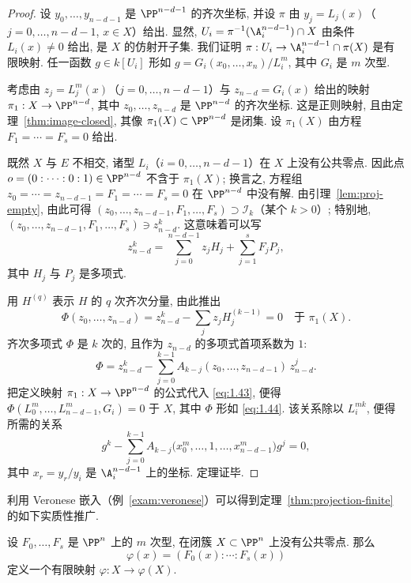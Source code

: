 \begin{proof}
	设 $y_0, \ldots, y_{n-d-1}$ 是 $\PP^{n-d-1}$ 的齐次坐标, 并设 $\pi$ 由 $y_j = L_j(x)$（$j = 0, \ldots, n-d-1$, $x \in X$）给出. 显然, $U_i = \pi^{-1}(\A^{n-d-1}_i) \cap X$ 由条件 $L_i(x) \ne 0$ 给出, 是 $X$ 的仿射开子集. 我们证明 $\pi: U_i \to \A^{n-d-1}_i \cap \pi(X)$ 是有限映射. 任一函数 $g \in k[U_i]$ 形如 $g = G_i(x_0, \ldots, x_n)/L_i^m$, 其中 $G_i$ 是 $m$ 次型.

	考虑由 $z_j = L_j^m(x)$（$j = 0, \ldots, n-d-1$）与 $z_{n-d} = G_i(x)$ 给出的映射 $\pi_1: X \to \PP^{n-d}$, 其中 $z_0, \ldots, z_{n-d}$ 是 $\PP^{n-d}$ 的齐次坐标. 这是正则映射, 且由定理~\ref{thm:image-closed}, 其像 $\pi_1(X) \subset \PP^{n-d}$ 是闭集. 设 $\pi_1(X)$ 由方程 $F_1 = \cdots = F_s = 0$ 给出.

	既然 $X$ 与 $E$ 不相交, 诸型 $L_i$（$i = 0, \ldots, n-d-1$）在 $X$ 上没有公共零点. 因此点 $o = (0 : \cdots : 0 : 1) \in \PP^{n-d}$ 不含于 $\pi_1(X)$; 换言之, 方程组 $z_0 = \cdots = z_{n-d-1} = F_1 = \cdots = F_s = 0$ 在 $\PP^{n-d}$ 中没有解. 由引理~\ref{lem:proj-empty}, 由此可得 $(z_0, \ldots, z_{n-d-1}, F_1, \ldots, F_s) \supset \mathcal I_k$（某个 $k > 0$）; 特别地, $(z_0, \ldots, z_{n-d-1}, F_1, \ldots, F_s) \ni z_{n-d}^k$. 这意味着可以写
	\[
		z_{n-d}^k = \sum_{j=0}^{n-d-1} z_j H_j + \sum_{j=1}^{s} F_j P_j,
	\]
	其中 $H_j$ 与 $P_j$ 是多项式.

	用 $H^{(q)}$ 表示 $H$ 的 $q$ 次齐次分量, 由此推出
	\begin{equation}
		\label{eq:1.43}
		\Phi(z_0, \ldots, z_{n-d}) = z_{n-d}^k - \sum_j z_j H_j^{(k-1)} = 0 \quad \text{于 } \pi_1(X).
	\end{equation}
	齐次多项式 $\Phi$ 是 $k$ 次的, 且作为 $z_{n-d}$ 的多项式首项系数为 $1$:
	\begin{equation}
		\label{eq:1.44}
		\Phi = z_{n-d}^k - \sum_{j=0}^{k-1} A_{k-j}(z_0, \ldots, z_{n-d-1})\, z_{n-d}^j.
	\end{equation}
	把定义映射 $\pi_1: X \to \PP^{n-d}$ 的公式代入 \eqref{eq:1.43}, 便得 $\Phi(L_0^m, \ldots, L_{n-d-1}^m, G_i) = 0$ 于 $X$, 其中 $\Phi$ 形如 \eqref{eq:1.44}. 该关系除以 $L_i^{mk}$, 便得所需的关系
	\[
		g^k - \sum_{j=0}^{k-1} A_{k-j}\bigl( x_0^m, \ldots, 1, \ldots, x_{n-d-1}^m \bigr) g^j = 0,
	\]
	其中 $x_r = y_r/y_i$ 是 $\A^{n-d-1}_i$ 上的坐标. 定理证毕.
\end{proof}

利用 Veronese 嵌入（例~\ref{exam:veronese}）可以得到定理~\ref{thm:projection-finite} 的如下实质性推广.

\begin{theorem}\label{thm:forms-finite}
	设 $F_0, \ldots, F_s$ 是 $\PP^n$ 上的 $m$ 次型, 在闭簇 $X \subset \PP^n$ 上没有公共零点. 那么
	\[
		\varphi(x) = (F_0(x) : \cdots : F_s(x))
	\]
	定义一个有限映射 $\varphi: X \to \varphi(X)$.
\end{theorem}

